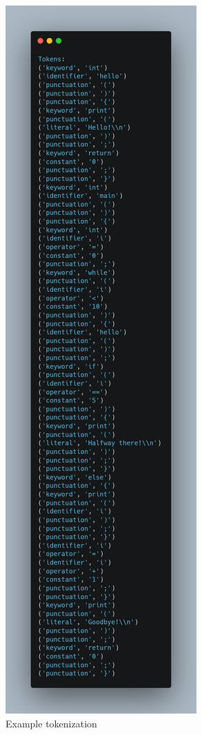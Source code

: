 \documentclass[12pt, letterpaper]{article}
\begin{document}
\begin{figure}[H]
    \centering
    \includegraphics[height=0.9\textheight]{2.png}
    \caption{Example tokenization}
    \label{fig:example_tokenization}
\end{figure}
\end{document}
